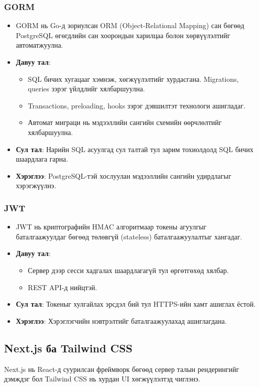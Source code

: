 \subsubsection{GORM}
\begin{itemize}
    \item GORM нь Go-д зориулсан ORM (Object-Relational Mapping) сан бөгөөд PostgreSQL өгөгдлийн сан хоорондын харилцаа болон хөрвүүлэлтийг автоматжуулна.
    \item \textbf{Давуу тал}: 
    \begin{itemize}
        \item SQL бичих хугацааг хэмнэж, хөгжүүлэлтийг хурдасгана. Migrations, queries зэрэг үйлдлийг хялбаршуулна.
        \item Transactions, preloading, hooks зэрэг дэвшилтэт технологи ашигладаг.
        \item Автомат миграци нь мэдээллийн сангийн схемийн өөрчлөлтийг хялбаршуулна.
    \end{itemize}
    \item \textbf{Сул тал}: Нарийн SQL асуулгад сул талтай тул зарим тохиолдолд SQL бичих шаардлага гарна.
    \item \textbf{Хэрэглээ}: PostgreSQL-тэй хослуулан мэдээллийн сангийн удирдлагыг хэрэгжүүлнэ.
\end{itemize}

\subsubsection{JWT}
\begin{itemize}
    \item JWT нь криптографийн HMAC алгоритмаар токены агуулгыг баталгаажуулдаг бөгөөд төлөвгүй (stateless) баталгаажуулалтыг хангадаг.
    \item \textbf{Давуу тал}: 
    \begin{itemize}
        \item Сервер дээр сесси хадгалах шаардлагагүй тул өргөтгөхөд хялбар.
        \item REST API-д нийцтэй.
    \end{itemize}
    \item \textbf{Сул тал}: Токеныг хулгайлах эрсдэл бий тул HTTPS-ийн хамт ашиглах ёстой.
    \item \textbf{Хэрэглээ}: Хэрэглэгчийн нэвтрэлтийг баталгаажуулахад ашиглагдана.
\end{itemize}

\subsection{Next.js ба Tailwind CSS}
Next.js нь React-д суурилсан фреймворк бөгөөд сервер талын рендерингийг дэмждэг бол Tailwind CSS нь хурдан UI хөгжүүлэлтэд чиглэнэ.

